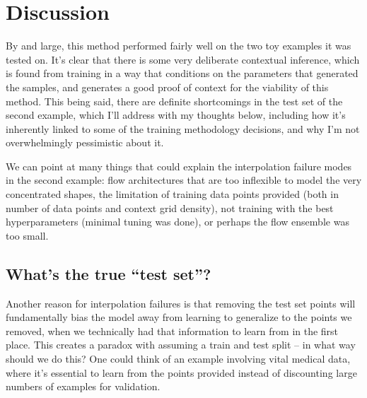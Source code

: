 \documentclass[
  11pt,
  numbers=noendperiod]{book}
\begin{document}
\hypertarget{sec-flow-discussion}{%
\section{Discussion}\label{sec-flow-discussion}}

By and large, this method performed fairly well on the two toy examples
it was tested on. It's clear that there is some very deliberate
contextual inference, which is found from training in a way that
conditions on the parameters that generated the samples, and generates a
good proof of context for the viability of this method. This being said,
there are definite shortcomings in the test set of the second example,
which I'll address with my thoughts below, including how it's inherently
linked to some of the training methodology decisions, and why I'm not
overwhelmingly pessimistic about it.

We can point at many things that could explain the interpolation failure
modes in the second example: flow architectures that are too inflexible
to model the very concentrated shapes, the limitation of training data
points provided (both in number of data points and context grid
density), not training with the best hyperparameters (minimal tuning was
done), or perhaps the flow ensemble was too small.

\hypertarget{whats-the-true-test-set}{%
\subsection{What's the true ``test
set''?}\label{whats-the-true-test-set}}

Another reason for interpolation failures is that removing the test set
points will fundamentally bias the model away from learning to
generalize to the points we removed, when we technically had that
information to learn from in the first place. This creates a paradox
with assuming a train and test split -- in what way should we do this?
One could think of an example involving vital medical data, where it's
essential to learn from the points provided instead of discounting large
numbers of examples for validation.
\end{document}
